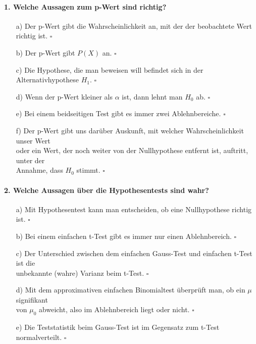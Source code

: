 \documentclass[a4paper]{article}
\begin{document}
\paragraph{1. Welche Aussagen zum p-Wert sind richtig?}
\begin{itemize}
    \item[a)] Der p-Wert gibt die Wahrscheinlichkeit an, mit der der beobachtete Wert richtig ist. \hfill $\square$
    \item[b)] Der p-Wert gibt $P(X)$ an. \hfill $\square$
    \item[c)] Die Hypothese, die man beweisen will befindet sich in der Alternativhypothese $H_1$. \hfill $\square$
    \item[d)] Wenn der p-Wert kleiner als $\alpha$ ist, dann lehnt man $H_0$ ab. \hfill $\square$
    \item[e)] Bei einem beidseitigen Test gibt es immer zwei Ablehnbereiche. \hfill $\square$
    \item[f)] Der p-Wert gibt uns darüber Auskunft, mit welcher Wahrscheinlichkeit unser Wert \\oder ein Wert, der noch weiter von der Nullhypothese entfernt ist, auftritt, unter der\\ Annahme, dass $H_0$ stimmt. \hfill $\square$
\end{itemize}

\paragraph{2. Welche Aussagen über die Hypothesentests sind wahr?}
\begin{itemize}
    \item[a)] Mit Hypothesentest kann man entscheiden, ob eine Nullhypothese richtig ist. \hfill $\square$
    \item[b)] Bei einem einfachen t-Test gibt es immer nur einen Ablehnbereich. \hfill $\square$
    \item[c)] Der Unterschied zwischen dem einfachen Gauss-Test und einfachen t-Test ist die\\ unbekannte (wahre) Varianz beim t-Test. \hfill $\square$
    \item[d)] Mit dem approximativen einfachen Binomialtest überprüft man, ob ein $\mu$ signifikant\\ von $\mu_0$ abweicht, also im Ablehnbereich liegt oder nicht. \hfill $\square$
    \item[e)] Die Teststatistik beim Gauss-Test ist im Gegensatz zum t-Test normalverteilt. \hfill $\square$
\end{itemize}
\end{document}
